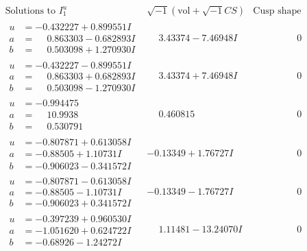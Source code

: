 \documentclass[1p]{elsarticle_modified}
\theoremstyle{definition}
\newcommand{\I}{\sqrt{-1}}
\begin{document}
$$\begin{array}{c|c|c}  
\text{Solutions to }I^u_{1}& \I (\text{vol} + \sqrt{-1}CS) & \text{Cusp shape}\\
 \hline 
\begin{aligned}
u &= -0.432227 + 0.899551 I \\
a &= \phantom{-}0.863303 - 0.682893 I \\
b &= \phantom{-}0.503098 + 1.270930 I\end{aligned}
 & \phantom{-}3.43374 - 7.46948 I & \phantom{-0.000000 } 0 \\ \hline\begin{aligned}
u &= -0.432227 - 0.899551 I \\
a &= \phantom{-}0.863303 + 0.682893 I \\
b &= \phantom{-}0.503098 - 1.270930 I\end{aligned}
 & \phantom{-}3.43374 + 7.46948 I & \phantom{-0.000000 } 0 \\ \hline\begin{aligned}
u &= -0.994475\phantom{ +0.000000I} \\
a &= \phantom{-}10.9938\phantom{ +0.000000I} \\
b &= \phantom{-}0.530791\phantom{ +0.000000I}\end{aligned}
 & \phantom{-}0.460815\phantom{ +0.000000I} & \phantom{-0.000000 } 0 \\ \hline\begin{aligned}
u &= -0.807871 + 0.613058 I \\
a &= -0.88505 + 1.10731 I \\
b &= -0.906023 - 0.341572 I\end{aligned}
 & -0.13349 + 1.76727 I & \phantom{-0.000000 } 0 \\ \hline\begin{aligned}
u &= -0.807871 - 0.613058 I \\
a &= -0.88505 - 1.10731 I \\
b &= -0.906023 + 0.341572 I\end{aligned}
 & -0.13349 - 1.76727 I & \phantom{-0.000000 } 0 \\ \hline\begin{aligned}
u &= -0.397239 + 0.960530 I \\
a &= -1.051620 + 0.624722 I \\
b &= -0.68926 - 1.24272 I\end{aligned}
 & \phantom{-}1.11481 - 13.24070 I & \phantom{-0.000000 } 0 \\ \hline\begin{aligned}

\end{aligned}
\end{array}$$
\end{document}
